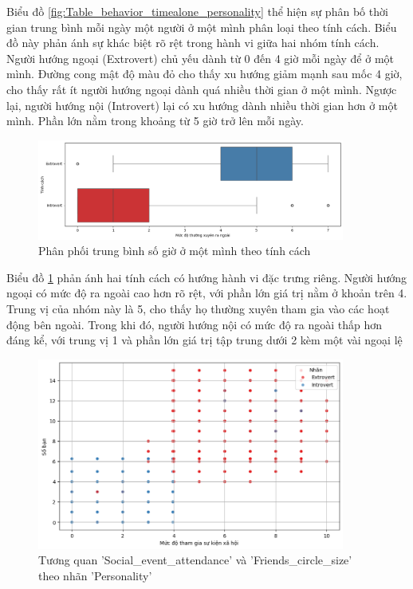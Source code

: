     Biểu đồ \ref{fig:Table_behavior_timealone_personality} thể hiện sự phân bố thời gian trung bình mỗi ngày một người ở một mình phân loại theo tính cách. Biểu đồ này phản ánh sự khác biệt rõ rệt trong hành vi giữa hai nhóm tính cách. Người hướng ngoại (Extrovert) chủ yếu dành từ 0 đến 4 giờ mỗi ngày để ở một mình. Đường cong mật độ màu đỏ cho thấy xu hướng giảm mạnh sau mốc 4 giờ, cho thấy rất ít người hướng ngoại dành quá nhiều thời gian ở một mình. Ngược lại, người hướng nội (Introvert) lại có xu hướng dành nhiều thời gian hơn ở một mình. Phần lớn nằm trong khoảng từ 5 giờ trở lên mỗi ngày.

    \begin{figure}[htp]
        \centering
        \includegraphics[width=0.9\textwidth]{images/Table_behavior_goingout_personality.png}
        \caption{Phân phối trung bình số giờ ở một mình theo tính cách}
        \label{fig:Table_behavior_goingout_personality}
    \end{figure}
    \FloatBarrier

    Biểu đồ \ref{fig:Table_behavior_goingout_personality} phản ánh hai tính cách có hướng hành vi đặc trưng riêng. Người hướng ngoại có mức độ ra ngoài cao hơn rõ rệt, với phần lớn giá trị nằm ở khoản trên 4. Trung vị của nhóm này là 5, cho thấy họ thường xuyên tham gia vào các hoạt động bên ngoài. Trong khi đó, người hướng nội có mức độ ra ngoài thấp hơn đáng kể, với trung vị 1 và phần lớn giá trị tập trung dưới 2 kèm một vài ngoại lệ

    \begin{figure}[htp]
        \centering
        \includegraphics[width=0.9\textwidth]{images/Table_behavior_event_friend_personality.png}
        \caption{Tương quan 'Social\_event\_attendance' và 'Friends\_circle\_size' theo nhãn 'Personality'}
        \label{fig:Table_behavior_event_friend_personality}
    \end{figure}
    \FloatBarrier

